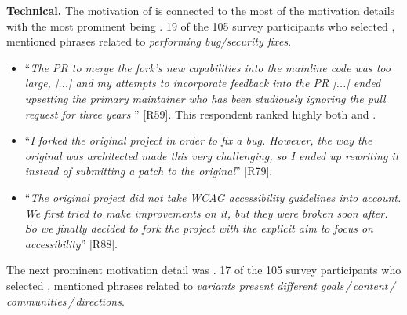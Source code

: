 \nd \textbf{Technical.} The motivation of  is connected to the most of the motivation details with the most prominent being . 19 of the 105 survey participants who selected , mentioned phrases related to \emph{performing bug/security fixes}.

\begin{itemize}[leftmargin=*]


\item ``\emph{The PR to merge the fork's new capabilities into the mainline code was too large, [...] %
and my attempts to incorporate feedback into the PR [...] %
ended upsetting the primary maintainer who has been studiously ignoring the pull request for three years \frownie{}}'' [R59].
This respondent ranked highly both  and .

\item ``\emph{I forked the original project in order to fix a bug. However, the way the original was architected made this very challenging, so I ended up rewriting it instead of submitting a patch to the original}'' [R79].

\item ``\emph{The original project did not take WCAG accessibility guidelines into account. We first tried to make improvements on it, but they were broken soon after. So we finally decided to fork the project with the explicit aim to focus on accessibility}'' [R88].

\end{itemize}

\nd The next prominent  motivation detail was . 17 of the 105 survey participants who selected ,  mentioned phrases related to \emph{variants present different goals\,/\,content\,/\,communities\,/\,directions}.

